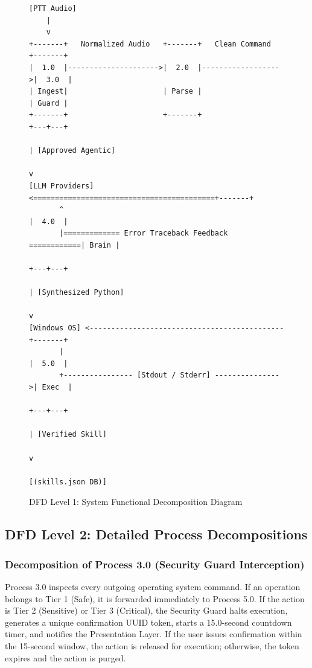 \begin{figure}[htbp]
\centering
{\scriptsize
\begin{verbatim}
[PTT Audio]
    |
    v
+-------+   Normalized Audio   +-------+   Clean Command   +-------+
|  1.0  |--------------------->|  2.0  |------------------>|  3.0  |
| Ingest|                      | Parse |                   | Guard |
+-------+                      +-------+                   +---+---+
                                                               | [Approved Agentic]
                                                               v
[LLM Providers] <==========================================+-------+
       ^                                                   |  4.0  |
       |============= Error Traceback Feedback ============| Brain |
                                                           +---+---+
                                                               | [Synthesized Python]
                                                               v
[Windows OS] <---------------------------------------------+-------+
       |                                                   |  5.0  |
       +---------------- [Stdout / Stderr] --------------->| Exec  |
                                                           +---+---+
                                                               | [Verified Skill]
                                                               v
                                                      [(skills.json DB)]
\end{verbatim}
}
\caption{DFD Level 1: System Functional Decomposition Diagram}
\label{fig:dfd_level_1}
\end{figure}

\subsection{DFD Level 2: Detailed Process Decompositions}

\subsubsection{Decomposition of Process 3.0 (Security Guard Interception)}
Process 3.0 inspects every outgoing operating system command. If an operation belongs to Tier 1 (Safe), it is forwarded immediately to Process 5.0. If the action is Tier 2 (Sensitive) or Tier 3 (Critical), the Security Guard halts execution, generates a unique confirmation UUID token, starts a 15.0-second countdown timer, and notifies the Presentation Layer. If the user issues confirmation within the 15-second window, the action is released for execution; otherwise, the token expires and the action is purged.

